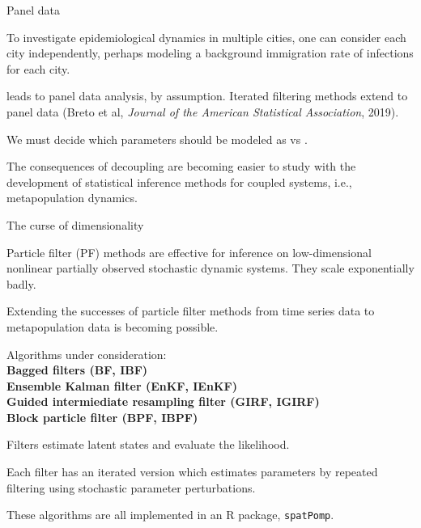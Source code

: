 \documentclass{beamer}
\begin{document}
\begin{frame}{Panel data}

\bi
\item To investigate epidemiological dynamics in multiple cities, one can consider each city independently, perhaps modeling a background immigration rate of infections for each city.

\item {} leads to panel data analysis, by assumption. Iterated filtering methods extend to panel data (Breto et al, {\it Journal of the American Statistical Association}, 2019).

\item We must decide which parameters should be modeled as  vs .

\item The consequences of decoupling are becoming easier to study with the development of statistical inference methods for coupled systems, i.e., metapopulation dynamics.

  \ei

  \end{frame}

\begin{frame}{The curse of dimensionality}

  \bi
  \item
    Particle filter (PF) methods are effective for inference on low-dimensional nonlinear partially observed stochastic dynamic systems. They scale exponentially badly.

\item Extending the successes of particle filter methods from time series data to metapopulation data is becoming possible.

\item Algorithms under consideration:\\
  {\bf
  Bagged filters (BF, IBF)\\
  Ensemble Kalman filter (EnKF, IEnKF)\\
  Guided intermiediate resampling filter (GIRF, IGIRF)\\
  Block particle filter (BPF, IBPF)\\
  }
  
\item Filters estimate latent states and evaluate the likelihood.
\item Each filter has an iterated version which estimates parameters by repeated filtering using stochastic parameter perturbations.

\item These algorithms are all implemented in an R package, \texttt{spatPomp}.
  
  \ei
  
\end{frame}
\end{document}
